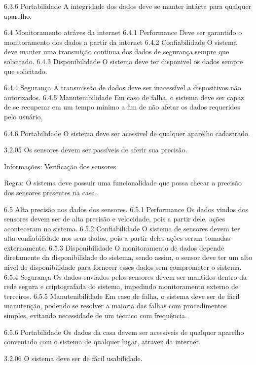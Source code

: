 6.3.6 Portabilidade
A integridade dos dados deve se manter intácta para qualquer aparelho.


6.4 Monitoramento atráves da internet
6.4.1 Performance 
Deve ser garantido o monitoramento dos dados a partir da internet
6.4.2 Confiabilidade
    O sistema deve manter uma transmição continua dos dados de segurança sempre que solicitado.  
6.4.3 Disponibilidade
    O sistema deve ter disponivel os dados sempre que solicitado.

6.4.4 Segurança
    A transmissão de dados deve ser inacessível a dispositivos não autorizados.
6.4.5 Manutenibilidade
    Em caso de falha, o sistema deve ser capaz de se recuperar em um tempo minimo a fim de não afetar os dados requeridos pelo usuário.

6.4.6 Portabilidade
    O sistema deve ser acessivel de qualquer aparelho cadastrado.


3.2.05    Os sensores devem ser passíveis de aferir sua precisão.
    
    Informações: Verificação dos sensores

    Regra: O sistema deve possuir uma funcionalidade que possa checar a precisão dos sensores presentes na casa.



6.5 Alta precisão nos dados dos sensores.
6.5.1 Performance 
   Os dados vindos dos sensores devem ser de alta precisão e velocidade, pois a partir dele, ações aconteceram no sistema. 
6.5.2 Confiabilidade
    O sistema de sensores devem ter alta confiabilidade nos seus dados, pois a partir deles ações seram tomadas externamente.
6.5.3 Disponibilidade
    O monitoramento de dados depende diretamente da disponibilidade do sistema, sendo assim, o sensor deve ter um alto nivel de disponibilidade para fornecer esses dados sem comprometer o sistema.
6.5.4 Segurança
    Os dados enviados pelos sensores devem ser mantidos dentro da rede segura e criptografada do sistema, impedindo monitoramento externo de terceiros.
6.5.5 Manutenibilidade
    Em caso de falha, o sistema deve ser de fácil manutenção, podendo se resolver a maioria das falhas com procedimentos simples, evitando necessidade de um técnico com frequência.

6.5.6 Portabilidade
    Os dados da casa devem ser acessiveis de qualquer aparelho conveniado com o sistema de qualquer lugar, atravez da internet.



3.2.06    O sistema deve ser de fácil usabilidade.
    
